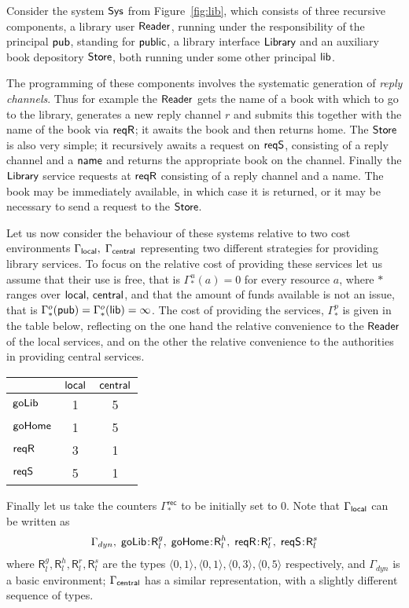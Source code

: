 \documentclass{LMCS}
\newcommand{\record}{{\scriptstyle \mathsf{rec}}}
\newcommand{\Gammadyn}{\Gamma_{\scriptstyle dyn}}
\def\pair(#1,#2){\langle #1 , #2 \rangle}\newcommand{\parrow}{ \mathbin{\rightharpoonup}}
\newcommand{\typeletter}[1]{{\mathsf{#1}}}
\newcommand{\tR}{\typeletter{R}}
\newcommand{\Cassoc}[2]{ {{#1}\kern -0.2em : \kern -0.2em {#2}}}
\begin{document}
\begin{exa}\label{ex:lib}
  

Consider the system $\mathsf{Sys}$ from Figure~\ref{fig:lib}, which consists
of three recursive components, a library user $\mathsf{Reader}$, running under
the responsibility of the principal ${\mathsf{pub}}$, standing for $\mathsf{public}$, 
a library interface $\mathsf{Library}$ and an auxiliary book depository $\mathsf{Store}$, both running
under some other principal ${\mathsf{lib}}$.

The programming of these components
involves the systematic generation of \emph{reply channels}. Thus for example 
the $\mathsf{Reader}$ gets the name of a book with which to go to the library, generates 
a new reply channel $r$ and submits  this together with the name of the book via 
$\mathsf{reqR}$; it awaits the book and then returns home.  The $\mathsf{Store}$ is also very simple;
it recursively awaits a request on $\mathsf{reqS}$, consisting of a reply channel and a $\mathsf{name}$
and returns the appropriate book on the channel. Finally the $\mathsf{Library}$
service requests at $\mathsf{reqR}$ consisting of a reply channel and a name. The book may be immediately
available, in which case it is returned, or it may be necessary to send a request to the $\mathsf{Store}$. 

Let us now consider the behaviour of these systems relative to two
cost environments $\Gamma_{\mathsf{local}}, \;\Gamma_{\mathsf{central}}$ representing
two different strategies for providing library services.  To focus on
the relative cost of providing these services let us assume that their
use is free, that is $\Gamma^u_{*}(a) = 0$ for every resource $a$, where $*$ ranges over
$\mathsf{local},\,\mathsf{central}$, and that 
the amount of funds available is not an issue, that is 
$\Gamma_{*}^o({\mathsf{pub}}) = \Gamma_{*}^o({\mathsf{lib}}) = \infty$.  The
cost of providing the services, $\Gamma^{p}_{*}$ is given in the table
below, reflecting on the one hand the relative convenience to the $\mathsf{Reader}$ 
of the local services, and on the other the relative convenience to the
authorities in providing central services.


\begin{center}
\begin{tabular}{|l|| c | c|}
\hline
          &$\mathsf{local}$ &$\mathsf{central}$\\\hline
$\mathsf{goLib}$    & 1       &5\\\hline
$\mathsf{goHome}$   & 1       &5\\\hline
$\mathsf{reqR}$     & 3       &1\\\hline
$\mathsf{reqS}$      & 5       &1\\\hline
\end{tabular}
\end{center}
Finally let us take the counters
$\Gamma^{\record}_{*}$ to be initially set to $0$. 
Note that $\Gamma_{\mathsf{local}}$ can be written as
\begin{align*}
  \Gammadyn,\; \Cassoc{\goLib}{\tR_l^g},\;\Cassoc{\goHome}{\tR_l^h},\;\Cassoc{\reqR}{\tR_l^r},\;\Cassoc{\reqS}{\tR_l^s}
\end{align*}
where $\tR_l^g,\tR_l^h, \tR_l^r, \tR_l^s$ are the types $\pair(0,1),\pair(0,1), \pair(0,3), \pair(0,5)$ respectively,
and $\Gammadyn$ is a basic environment;  $\Gamma_{\mathsf{central}}$ has a similar representation, with a slightly different
sequence of types. 



\end{exa}
\end{document}
